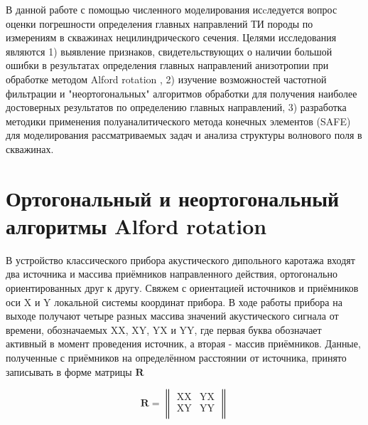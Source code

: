 \documentclass[a4paper,11pt]{article}
\begin{document}
В данной работе с помощью численного моделирования исcледуется вопрос оценки погрешности определения главных направлений ТИ породы по измерениям в скважинах нецилиндрического сечения. Целями исследования являются 1) выявление признаков, свидетельствующих о наличии большой ошибки в результатах определения главных направлений анизотропии при обработке методом Alford rotation%
, 2) изучение возможностей частотной фильтрации и "неортогональных" алгоритмов обработки для получения наиболее достоверных результатов по определению главных направлений, 3) разработка методики применения полуаналитического метода конечных элементов (SAFE) \cite{Bartoli2006} для моделирования рассматриваемых задач и анализа структуры волнового поля в скважинах. %

\section{Ортогональный и неортогональный алгоритмы Alford rotation}
В устройство классического прибора акустического дипольного каротажа входят два источника и массива приёмников направленного действия, ортогонально ориентированных друг к другу. Свяжем с ориентацией источников и приёмников оси X и Y локальной системы координат прибора. В ходе работы прибора на выходе получают четыре разных массива значений акустического сигнала от времени, обозначаемых XX, XY, YX и YY, где первая буква обозначает активный в момент проведения источник, а вторая - массив приёмников. Данные, полученные с приёмников на определённом расстоянии от источника, принято записывать в форме матрицы $\mathbf{R}$ 

\begin{equation}
	\mathbf{R} = \left\|
	\begin{array}{cc}
	\text{XX} & \text{YX} \\
	\text{XY} & \text{YY} \\
	\end{array}
	\right\| 
	\label{eq:R_matrix}
\end{equation}
\end{document}
